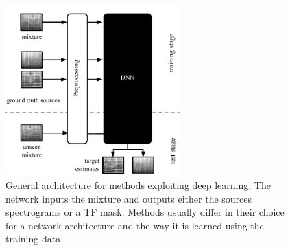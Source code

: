 \begin{figure}
  \centering
  \includegraphics[width=0.6\textwidth]{Chapters/06_Separation_Unknown/figures/methods_dnn.pdf}
  \caption{General architecture for methods exploiting deep learning. The network inputs the mixture and outputs either the sources spectrograms or a TF mask. Methods usually differ in their choice for a network architecture and the way it is learned using the training data.}
  \label{fig:methods_dnn}
\end{figure}

